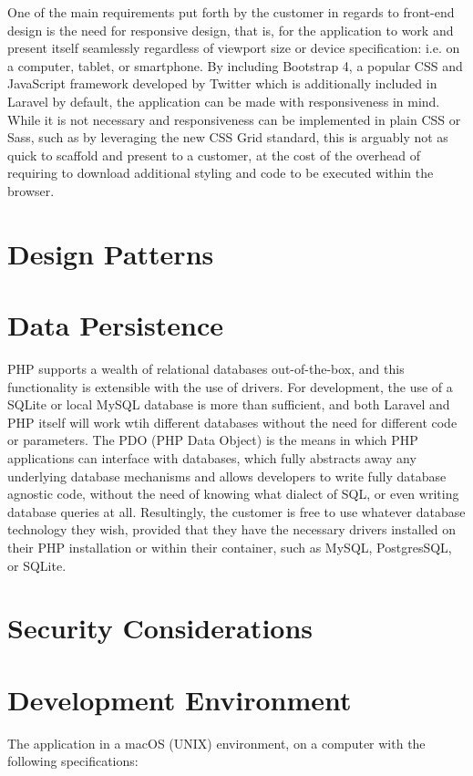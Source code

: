 One of the main requirements put forth by the customer in regards to front-end design is the need for responsive design, that is, for the application to work and present itself seamlessly regardless of viewport size or device specification: i.e. on a computer, tablet, or smartphone. By including Bootstrap 4, a popular CSS and JavaScript framework developed by Twitter which is additionally included in Laravel by default, the application can be made with responsiveness in mind. While it is not necessary and responsiveness can be implemented in plain CSS or Sass, such as by leveraging the new CSS Grid standard, this is arguably not as quick to scaffold and present to a customer, at the cost of the overhead of requiring to download additional styling and code to be executed within the browser. \cite{Laravel3}

\section{Design Patterns}


\section{Data Persistence}

PHP supports a wealth of relational databases out-of-the-box, and this functionality is extensible with the use of drivers. For development, the use of a SQLite or local MySQL database is more than sufficient, and both Laravel and PHP itself will work wtih different databases without the need for different code or parameters. The PDO (PHP Data Object) is the means in which PHP applications can interface with databases, which fully abstracts away any underlying database mechanisms and allows developers to write fully database agnostic code, without the need of knowing what dialect of SQL, or even writing database queries at all. Resultingly, the customer is free to use whatever database technology they wish, provided that they have the necessary drivers installed on their PHP installation or within their container, such as MySQL, PostgresSQL, or SQLite. \cite{PHP1}

\section{Security Considerations}

\section{Development Environment}
The application in a macOS (UNIX) environment, on a computer with the following specifications:

